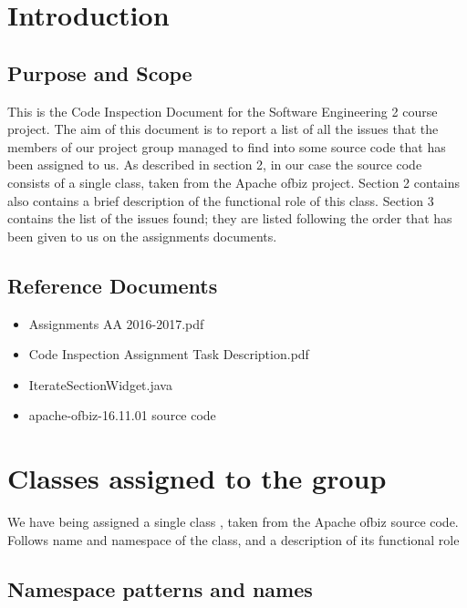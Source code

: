 \documentclass{article}
\begin{document}
\newpage  
 
\begin{flushleft}  

\section{Introduction}


\subsection{Purpose and Scope}
This is the Code Inspection Document for the Software Engineering 2 course project. The aim of this document is to report a list of all the issues that the members of our project group managed to find into some source code that has been assigned to us.
As described in section 2, in our case the source code consists of a single class, taken from the Apache ofbiz project. Section 2 contains also contains a brief description of the functional role of this class.
Section 3 contains the list of the issues found; they are listed following the order that has been given to us on the assignments documents.


\vspace{1cm}
\subsection{Reference Documents}

\begin{itemize}
\item Assignments AA 2016-2017.pdf
\item Code Inspection Assignment Task Description.pdf
\item IterateSectionWidget.java
\item apache-ofbiz-16.11.01 source code
\end{itemize}


\newpage
\section{Classes assigned to the group}
We have being assigned a single class , taken from the Apache ofbiz source code. Follows name and namespace of the class, and a description of its functional role
\vspace{1cm}
\subsection{Namespace patterns and names}



\end{flushleft}
\end{document}
